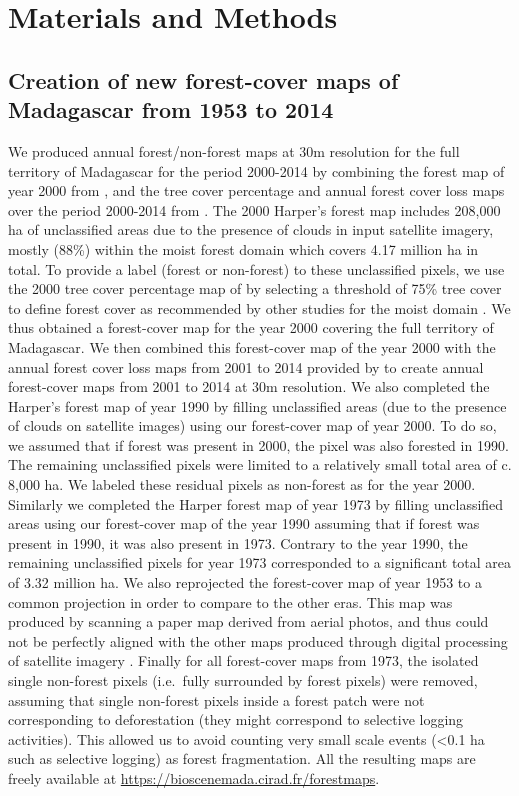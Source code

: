 \documentclass[a4paper, 12pt, leqno]{article} %
\begin{document}
\section{Materials and Methods}
\label{materials-and-methods}

\subsection{Creation of new forest-cover maps of Madagascar from
1953 to 2014}

We produced annual forest/non-forest maps at 30m resolution for the
full territory of Madagascar for the period 2000-2014 by combining the
forest map of year 2000 from \citet{Harper2007}, and the tree cover
percentage and annual forest cover loss maps over the period 2000-2014
from \citet{Hansen2013}. The 2000 Harper's forest map includes 208,000
ha of unclassified areas due to the presence of clouds in input
satellite imagery, mostly (88\%) within the moist forest domain which
covers 4.17 million ha in total. To provide a label (forest or
non-forest) to these unclassified pixels, we use the 2000 tree cover
percentage map of \citet{Hansen2013} by selecting a threshold of 75\%
tree cover to define forest cover as recommended by other studies for
the moist domain \citep{Achard2014}. We thus obtained a forest-cover
map for the year 2000 covering the full territory of Madagascar. We
then combined this forest-cover map of the year 2000 with the annual
forest cover loss maps from 2001 to 2014 provided by
\citet{Hansen2013} to create annual forest-cover maps from 2001 to
2014 at 30m resolution. We also completed the Harper's forest map of
year 1990 by filling unclassified areas (due to the presence of clouds
on satellite images) using our forest-cover map of year 2000. To do
so, we assumed that if forest was present in 2000, the pixel was also
forested in 1990. The remaining unclassified pixels were limited to a
relatively small total area of c. 8,000 ha. We labeled these residual
pixels as non-forest as for the year 2000.  Similarly we completed the
Harper forest map of year 1973 by filling unclassified areas using our
forest-cover map of the year 1990 assuming that if forest was present
in 1990, it was also present in 1973.  Contrary to the year 1990, the
remaining unclassified pixels for year 1973 corresponded to a
significant total area of 3.32 million ha. We also reprojected the
forest-cover map of year 1953 to a common projection in order to
compare to the other eras. This map was produced by scanning a paper
map derived from aerial photos, and thus could not be perfectly
aligned with the other maps produced through digital processing of
satellite imagery \citep{Harper2007}. Finally for all forest-cover
maps from 1973, the isolated single non-forest pixels (i.e.~fully
surrounded by forest pixels) were removed, assuming that single
non-forest pixels inside a forest patch were not corresponding to
deforestation (they might correspond to selective logging activities).
This allowed us to avoid counting very small scale events
(\textless{}0.1 ha such as selective logging) as forest fragmentation.
All the resulting maps are freely available at
\url{https://bioscenemada.cirad.fr/forestmaps}.
\end{document}

